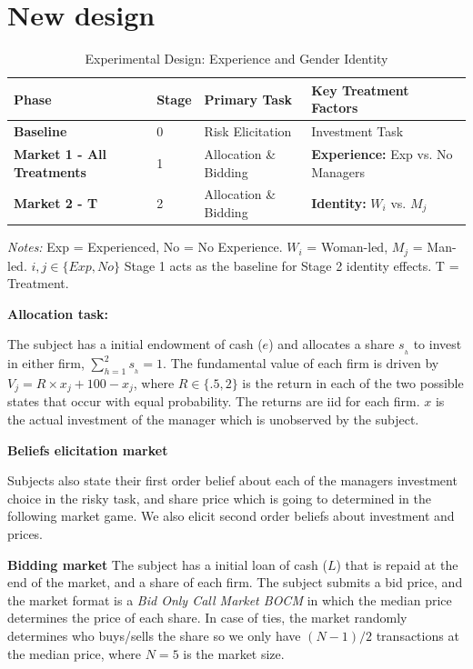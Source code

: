 \documentclass[12pt, letterpaper]{article}
\begin{document}
\section{New design}

\begin{table}[htbp]
  \centering
  \caption{Experimental Design: Experience and Gender Identity}
  \label{tab:exp_design_final}
  \small
  \begin{tabular}{@{}llll@{}}
    \toprule
    \textbf{Phase} & \textbf{Stage} & \textbf{Primary Task} & \textbf{Key Treatment Factors} \\ \midrule
    \textbf{Baseline} & 0 & Risk Elicitation & Investment Task  \\
    \addlinespace
    \textbf{Market 1 - All Treatments} & 1 & Allocation \& Bidding & \textbf{Experience:} Exp vs. No Managers \\
    \addlinespace
    \textbf{Market 2 - T} & 2 & Allocation \& Bidding & \textbf{Identity:} $W_i$ vs. $M_j$   \\
    \bottomrule
  \end{tabular}
  \vspace{1ex}
  \begin{flushleft}
    \footnotesize \textit{Notes:} Exp = Experienced, No = No Experience. $W_i$ = Woman-led, $M_j$ = Man-led. $i,j\in\{Exp,No\}$ Stage 1 acts as the baseline for Stage 2 identity effects. T = Treatment. 
  \end{flushleft}
\end{table}

\textbf{Allocation task: }

The subject has a initial endowment of cash ($e$) and allocates a share $s_{_{h}}$ to invest in either firm, $\sum^2_{h=1} s_{_{h}}=1$.
The fundamental value of each firm is driven by $V_j= R\times x_j+100-x_j$, where $R\in\{.5, 2\}$ is the return in each of the two possible states that occur with equal probability. The returns are iid for each firm. $x$ is the actual investment of the manager which is unobserved by the subject. 

\textbf{Beliefs elicitation market}

Subjects also state their first order belief about each of the managers investment choice in the risky task, and share price which is going to determined in the following market game. We also elicit second order beliefs about investment and prices. 

\textbf{Bidding market}
The subject has a initial loan of cash ($L$) that is repaid at the end of the market, and a share of each firm. The subject submits a bid price, and the market format is a \emph{Bid Only Call Market BOCM} in which the median price determines the price of each share. In case of ties, the market randomly determines who buys/sells the share so we only have $(N-1)/2$ transactions at the median price, where $N=5$ is the market size. 
\end{document}
